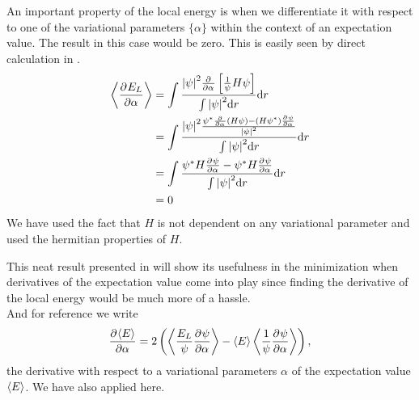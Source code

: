         An important property of the local energy is when we differentiate it
        with respect to one of the variational parameters $\{\alpha\}$ within
        the context of an expectation value. The result in this case would be
        zero. This is easily seen by direct calculation in
        .
            \begin{align}
                \ecp{\prd{\alpha}[E_L]} &= \int \frac{\abs{\psi}^2\prd{\alpha}
                \left[\frac{1}{\psi}H\psi\right]}{\int \abs{\psi}^2 \md r} \md
                r \nonumber \\
                &= \int \frac{\abs{\psi}^2 \frac{\psi^{*}\prd{\alpha}(H\psi) -
                (H\psi^{*}) \prd{\alpha}[\psi]}{\abs{\psi}^2}}{\int
                \abs{\psi}^2 \md r} \md r \nonumber \\
                &= \int \frac{\psi^{*}H\prd{\alpha}[\psi] -
                \psi^{*}H\prd{\alpha}[\psi]}{\int \abs{\psi}^2 \md r} \md r
                \nonumber \\
                &= 0
                \label{eq:expELdelzero}
            \end{align}
        We have used the fact that $H$ is not dependent on any variational
        parameter and used the hermitian properties \cite{GriffQuan} of $H$.

        This neat result presented in  will show its
        usefulness in the minimization when derivatives of the expectation
        value come into play since finding the derivative of the local energy
        would be much more of a hassle. \\
        And for reference we write
            \begin{equation}
               \prd{\alpha}[\ecp{E}] =
                2\left(\ecp{\frac{E_L}{\psi}\prd{\alpha}[\psi]} -
                \ecp{E}\ecp{\frac{1}{\psi}\prd{\alpha}[\psi]}\right),
            \end{equation}
        the derivative with respect to a variational parameters $\alpha$ of the
        expectation value $\left< {E} \right>$. We have also applied 
        here.

